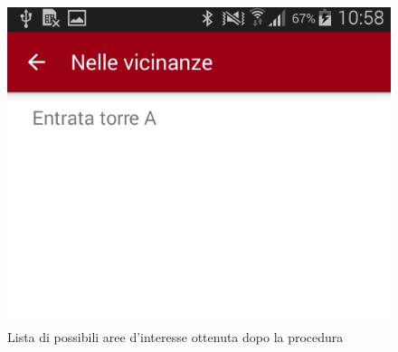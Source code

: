 \documentclass[../ClipsManualeUtente.tex]{subfiles}
\begin{document}
		\begin{figure} [h]
			\centering
			\includegraphics[scale=0.3]{img/ListaNearbyPoi}
			\caption{Lista di possibili aree d'interesse ottenuta dopo la procedura}
		\end{figure}
		

		
\end{document}
